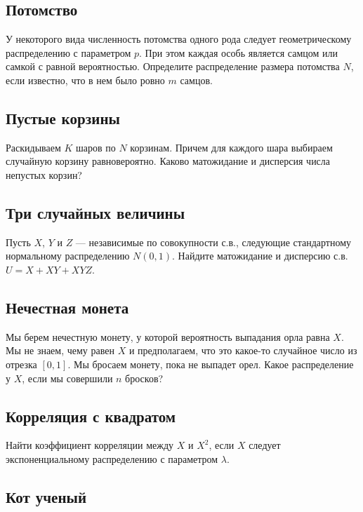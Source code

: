 \documentclass[12pt]{article}
\begin{document}
\subsection{Потомство}

У некоторого вида численность потомства одного рода следует геометрическому распределению с параметром $p$. При этом каждая особь является самцом или самкой с равной вероятностью. Определите распределение размера потомства $N$, если известно, что в нем было ровно $m$ самцов.



\subsection{Пустые корзины}

Раскидываем $K$ шаров по $N$ корзинам. Причем для каждого шара выбираем случайную корзину равновероятно. Каково матожидание и дисперсия числа непустых корзин?



\subsection{Три случайных величины}

Пусть $X$, $Y$ и $Z$ --- независимые по совокупности с.в., следующие стандартному нормальному распределению $N(0, 1)$. Найдите матожидание и дисперсию с.в. $U = X + XY + XYZ$. 



\subsection{Нечестная монета}

Мы берем нечестную монету, у которой вероятность выпадания орла равна $X$. Мы не знаем, чему равен $X$ и предполагаем, что это какое-то случайное число из отрезка $[0, 1]$. Мы бросаем монету, пока не выпадет орел. Какое распределение у $X$, если мы совершили $n$ бросков?



\subsection{Корреляция с квадратом}

Найти коэффициент корреляции между $X$ и $X^2$, если $X$ следует экспоненциальному распределению с параметром $\lambda$.



\subsection{Кот ученый}
\end{document}
